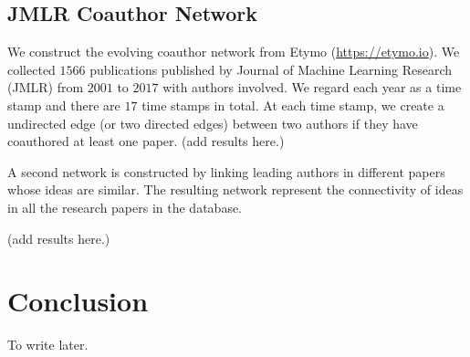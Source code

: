 \documentclass[12pt]{article}
\theoremstyle{definition}
\begin{document}
\subsection{JMLR Coauthor Network}
\label{sec:jmlr-coauth-netw}


We construct the evolving coauthor network from Etymo (\url{https://etymo.io}).
We collected $1566$ publications published by Journal of Machine Learning Research (JMLR) from $2001$ to $2017$ with authors involved. We regard each year
as a time stamp and there are $17$ time stamps in total. At each time stamp, we
create a undirected edge (or two directed edges) between two authors if they have coauthored at least one paper.
(add results here.)

A second network is constructed by linking leading authors in different papers whose
ideas are similar. The resulting network represent the connectivity of ideas in all the research papers in the database.

(add results here.)



















\section{Conclusion}
\label{sec:conclusion}

To write later.



\end{document}
